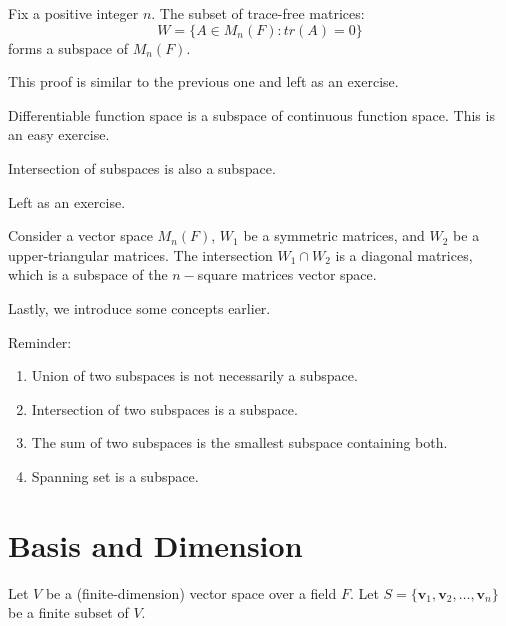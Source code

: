 \documentclass[12pt]{article}
\begin{document}
\begin{theorem}
Fix a positive integer $n$. The subset of trace-free matrices:
\[W=\{A\in M_n(F): tr(A)=0\}\]
forms a subspace of $M_n(F)$.
\end{theorem}

\begin{pfbox}
    This proof is similar to the previous one and left as an exercise.
\end{pfbox}

\begin{example}
    Differentiable function space is a subspace of continuous function space. This is an easy exercise.
\end{example}

\begin{theorem}
    Intersection of subspaces is also a subspace.
\end{theorem}
\begin{pfbox}
    Left as an exercise.
\end{pfbox}

\begin{example}
    Consider a vector space $M_n(F)$, $W_1$ be a symmetric matrices, and $W_2$ be a upper-triangular matrices.
    The intersection $W_1\cap W_2$ is a diagonal matrices, which is a subspace of the $n-$square matrices vector space. 
\end{example}

Lastly, we introduce some concepts earlier.
\begin{property}
Reminder: 
\begin{enumerate}
    \item Union of two subspaces is not necessarily a subspace.
    \item Intersection of two subspaces is a subspace.
    \item The sum of two subspaces is the smallest subspace containing both.
    \item Spanning set is a subspace.
\end{enumerate}
\end{property}

\newpage
\section{Basis and Dimension}

Let $V$ be a (finite-dimension) vector space over a field $F$.
Let $S=\{\mathbf{v}_1,\mathbf{v}_2,\ldots,\mathbf{v}_n\}$ be a finite subset of $V$.
\end{document}
